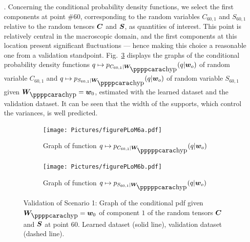 .
%
Concerning the conditional probability density functions, we select the first components at point $\# 60$, corresponding to the random variables $C_{60,1}$ and $S_{60,1}$ relative to the random tensors ${\boldsymbol{C}}$ and ${\boldsymbol{S}}$, as quantities of interest. This point is relatively central in the macroscopic domain, and the first components at this location present significant fluctuations --- hence making this choice a reasonable one from a validation standpoint.
%
Fig.~\ref{fig:figurePLoM6} displays the graphs of the conditional probability density functions $q\mapsto p_{ C_{60,1} \vert \bfW_\hypp } (q \vert \bfw_o)$ of random variable $C_{60,1}$ and $q\mapsto p_{ S_{60,1} \vert \bfW_\hypp} (q \vert \bfw_o)$ of random variable $S_{60,1}$ given $\bfW_\hypp =\bfw_0$, estimated with the learned dataset and the validation dataset. It can be seen that the width of the supports, which control the variances, is well predicted. 
\begin{figure}[!htb]
    \begin{center}
        \begin{subfigure}[b]{0.45\textwidth}
            \begin{center}
                \texttt{[image: Pictures/figurePLoM6a.pdf]}
            \end{center}
                \caption{Graph of function $q\mapsto p_{ C_{60,1} \vert \bfW_\hyppp } (q \vert \bfw_o)$}
                \label{fig:figurePLoM6a}
            \end{subfigure}
            \begin{subfigure}[b]{0.45\textwidth}
                \begin{center}
                    \texttt{[image: Pictures/figurePLoM6b.pdf]}
                \end{center}
                \caption{Graph of function $q\mapsto p_{ S_{60,1} \vert \bfW_\hyppp } (q \vert \bfw_o)$}
                \label{fig:figurePLoM6b}
            \end{subfigure}
    \end{center}
    \caption[Validation of Scenario 1: Graph of the conditional pdf.]{Validation of Scenario 1: Graph of the conditional pdf given $\bfW_\hypp =\bfw_0$ of component $1$ of the random tensors ${\boldsymbol{C}}$ and ${\boldsymbol{S}}$ at point $60$. Learned dataset (solid line), validation dataset (dashed line).}
    \label{fig:figurePLoM6}
\end{figure}

